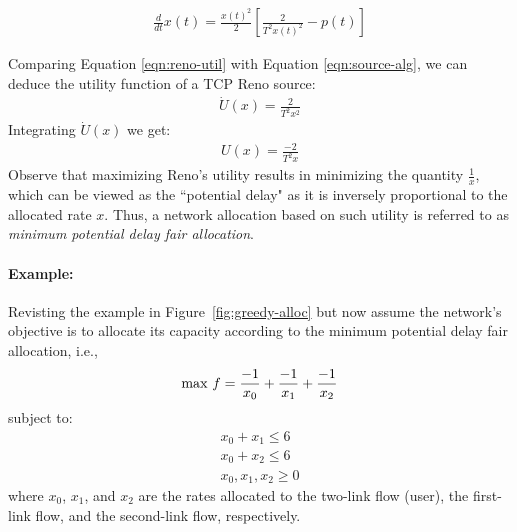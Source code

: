 \documentclass{article}
\begin{document}
\begin{eqnarray}
\frac{d}{dt} x(t) = \frac{{x(t)}^2}{2} [\frac{2}{T^2 x(t)^2}  - p(t)]
\label{eqn:reno-util}
\end{eqnarray}

Comparing Equation \ref{eqn:reno-util} with Equation \ref{eqn:source-alg},
we can deduce the utility function of a TCP Reno source:
\begin{eqnarray*}
\dot{U}(x) = \frac{2}{T^2 x^2} 
\end{eqnarray*}
Integrating $\dot{U}(x)$ we get:
\begin{eqnarray*}
U(x) =  \frac{-2}{T^2 x} 
\end{eqnarray*}
Observe that maximizing Reno's utility results in minimizing the quantity $\frac{1}{x}$, which can be viewed as the ``potential delay" as it is inversely proportional to the allocated rate $x$. 
Thus, a network allocation based on such utility is referred to as {\em minimum potential delay fair allocation}.

\paragraph*{Example:} 
Revisting the example in Figure~\ref{fig:greedy-alloc} but now assume the network's objective is to allocate its capacity according to the minimum potential delay fair allocation, i.e., 
\begin{eqnarray*}
{\rm max} \ f = \frac{-1}{x_0} + \frac{-1}{x_1} + \frac{-1}{x_2} 
\end{eqnarray*}
subject to:
\begin{eqnarray*}
x_0 + x_1 \leq 6 \\
x_0 + x_2 \leq 6 \\
x_0, x_1, x_2 \geq 0
\end{eqnarray*}
where $x_0$, $x_1$, and $x_2$ are the rates allocated to the two-link flow (user), the first-link flow, and the second-link flow, respectively. 
\end{document}
